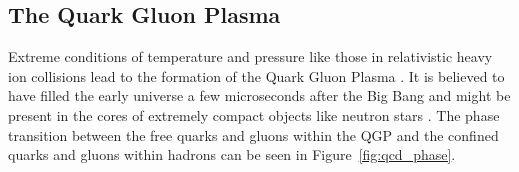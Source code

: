 





\subsection{The Quark Gluon Plasma}
\label{sec:qgp}
Extreme conditions of temperature and pressure like those in relativistic heavy ion collisions lead to the formation of the Quark Gluon Plasma \cite{SHURYAK198071}. It is believed to have filled the early universe a few microseconds after the Big Bang and might be present in the cores of extremely compact objects like neutron stars \cite{PhysRevLett.34.1353, Linde_1979}. The phase transition between the free quarks and gluons within the QGP and the confined quarks and gluons within hadrons can be seen in Figure~\ref{fig:qcd_phase}.  

